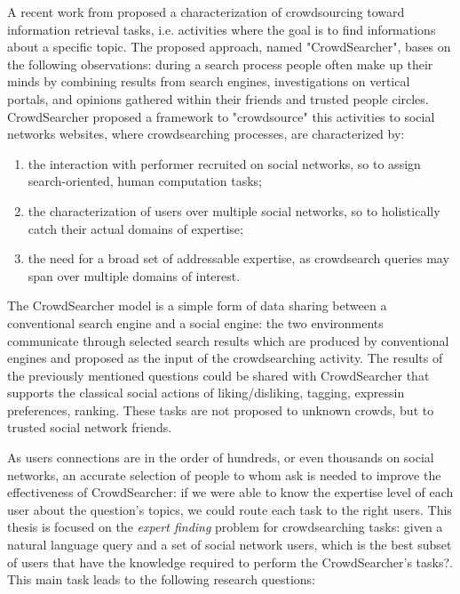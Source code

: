 A recent work from \citet{paperboz} proposed a characterization of crowdsourcing
toward information retrieval tasks, i.e. activities where the goal is to find
informations about a specific topic. The proposed approach, named "CrowdSearcher",
bases on the following observations: during a search process people often make up
their minds by combining results from search engines, investigations on vertical
portals, and opinions gathered within their friends and trusted people circles.
CrowdSearcher proposed a framework to "crowdsource" this activities to social
networks websites, where crowdsearching processes,  are characterized by:

\begin{enumerate}
	\item the interaction with performer recruited on social networks, so to
	assign search-oriented, human computation tasks;
	\item the characterization of users over multiple social networks, so to
	holistically catch their actual domains of expertise;
	\item the need for a broad set of addressable expertise, as crowdsearch
	queries may span over multiple domains of interest.
\end{enumerate}

The CrowdSearcher model is a simple form of data sharing between a conventional
search engine and a social engine: the two environments communicate through
selected search results which are produced by conventional engines and proposed
as the input of the crowdsearching activity. 
The results of the previously mentioned questions could be shared with CrowdSearcher
that supports the classical social actions of liking/disliking, tagging, expressin
preferences, ranking. These tasks are not proposed to unknown crowds, but to trusted
social network friends.

As users connections are in the order of hundreds, or even thousands on social networks,
an accurate selection of people to whom ask is needed to improve the effectiveness of
CrowdSearcher: if we were able to know the expertise level of each user about the
question's topics, we could route each task to the right users. This thesis is focused
on the \emph{expert finding} problem for crowdsearching tasks: given a natural language
query and a set of social network users, which is the best subset of users that have
the knowledge required to perform the CrowdSearcher's tasks?. This main task leads to
the following research questions:

